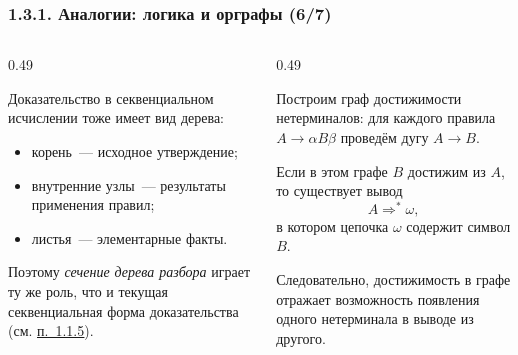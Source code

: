 \documentclass[mathserif,12pt,aspectratio=169]{beamer}
\renewcommand{\index}[1]{}
\def\odmkey#1#2{{\it\color{red} #1}\index{#2}}
\def\DMref#1#2{{\color{blue}\underline{\hyperlink{#2}{#1}}}}
\begin{document}
\begin{frame}
\frametitle{1.3.1. Аналогии: логика и орграфы (6/7)}
\begin{columns}[T,totalwidth=\textwidth]
\begin{column}{0.49\textwidth}
\begin{digress}
Доказательство в секвенциальном исчислении тоже имеет вид дерева:
\begin{itemize}
\item корень~--- исходное утверждение;
\item внутренние узлы~--- результаты применения правил;
\item листья~--- элементарные факты.
\end{itemize}

Поэтому \odmkey{сечение дерева разбора}{Сечение!дерева}
играет ту же роль, что и текущая секвенциальная форма доказательства
(см. \DMref{п.~1.1.5}{1.1.5.}).
\end{digress}
\end{column}
\begin{column}{0.49\textwidth}
\begin{digress}
Построим граф достижимости нетерминалов:
для каждого правила $A \to \alpha B \beta$
проведём дугу $A \to B$.

\smallskip
Если в этом графе $B$ достижим из $A$, то существует вывод
\[
A \Rightarrow^* \omega,
\]
в котором цепочка $\omega$ содержит символ $B$.

Следовательно, достижимость в графе отражает возможность появления
одного нетерминала в выводе из другого.
\end{digress}
\end{column}
\end{columns}

\end{frame}
\end{document}
